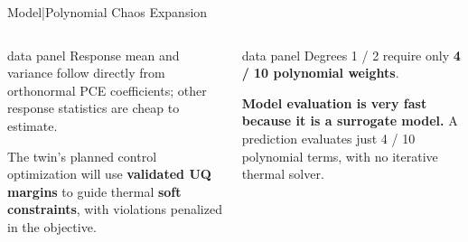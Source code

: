 \begin{frame}{Model\enspace|\enspace Polynomial Chaos Expansion}
  \begin{columns}[T,onlytextwidth]
      \begin{beamercolorbox}[sep=2mm,wd=\linewidth]{data panel}
        \footnotesize
        Response mean and variance follow directly from orthonormal PCE coefficients;
        other response statistics are cheap to estimate.\par
        \smallskip
        The twin's planned control optimization will use \textbf{validated UQ margins}
        to guide thermal \textbf{soft constraints}, with violations penalized in the objective.
      \end{beamercolorbox}
      \medskip
      \begin{beamercolorbox}[sep=2mm,wd=\linewidth]{data panel}
        \footnotesize
        Degrees 1 / 2 require only \textbf{4 / 10 polynomial weights}.\par
        \smallskip
        \textbf{Model evaluation is very fast because it is a surrogate model.}
        A prediction evaluates just 4 / 10 polynomial terms, with no iterative thermal solver.
      \end{beamercolorbox}


\end{columns}
\end{frame}
